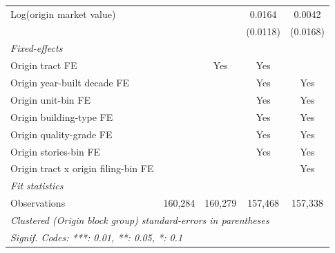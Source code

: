 \begin{tabular}{lcccc}
   Log(origin market value)                       &          &          & 0.0164          & 0.0042\\   
                                                  &          &          & (0.0118)        & (0.0168)\\   
   \midrule
   \emph{Fixed-effects}\\
   Origin tract FE                                &          & Yes      & Yes             & \\  
   Origin year-built decade FE                    &          &          & Yes             & Yes\\  
   Origin unit-bin FE                             &          &          & Yes             & Yes\\  
   Origin building-type FE                        &          &          & Yes             & Yes\\  
   Origin quality-grade FE                        &          &          & Yes             & Yes\\  
   Origin stories-bin FE                          &          &          & Yes             & Yes\\  
   Origin tract x origin filing-bin FE            &          &          &                 & Yes\\  
   \midrule
   \emph{Fit statistics}\\
   Observations                                   & 160,284  & 160,279  & 157,468         & 157,338\\  
   \midrule \midrule
   \multicolumn{5}{l}{\emph{Clustered (Origin block group) standard-errors in parentheses}}\\
   \multicolumn{5}{l}{\emph{Signif. Codes: ***: 0.01, **: 0.05, *: 0.1}}\\
\end{tabular}
\par\endgroup

